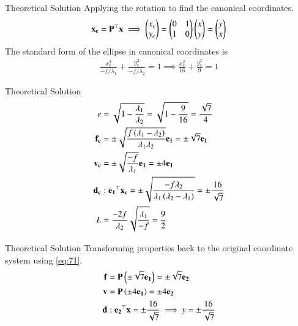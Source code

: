 \documentclass{beamer}
\begin{document}
	\begin{frame}{Theoretical Solution}
		Applying the rotation to find the canonical coordinates.
		\begin{align}
			\mathbf{x_c} = \mathbf{P}^\top\mathbf{x} \implies \begin{pmatrix}x_c \\ y_c\end{pmatrix} = \begin{pmatrix}0 & 1 \\ 1 & 0\end{pmatrix}\begin{pmatrix}x \\ y\end{pmatrix} = \begin{pmatrix}y \\ x\end{pmatrix}
		\end{align}
		The standard form of the ellipse in canonical coordinates is
		\begin{align}
			\frac{x_c^2}{-f/\lambda_1} + \frac{y_c^2}{-f/\lambda_2} = 1 \implies \frac{x_c^2}{16} + \frac{y_c^2}{9} = 1
		\end{align}
	\end{frame}
	
	\begin{frame}{Theoretical Solution}
		\begin{align}
			e &= \sqrt{1 - \frac{\lambda_1}{\lambda_2}} = \sqrt{1 - \frac{9}{16}} = \frac{\sqrt{7}}{4} \\
			\mathbf{f_c} &= \pm\sqrt{\frac{f\left(\lambda_1 - \lambda_2\right)}{\lambda_1\lambda_2}}\mathbf{e_1} = \pm \sqrt{7}\mathbf{e_1} \\
			\mathbf{v_c} &= \pm\sqrt{\frac{-f}{\lambda_1}}\mathbf{e_1} = \pm 4\mathbf{e_1} \\
			\mathbf{d_c} &: \mathbf{e_1}^\top\mathbf{x_c} = \pm\sqrt{\frac{-f\lambda_2}{\lambda_1\left(\lambda_2-\lambda_1\right)}} = \pm\frac{16}{\sqrt{7}} \\
			L &= \frac{-2f}{\lambda_2}\sqrt{\frac{\lambda_1}{-f}} = \frac{9}{2}
		\end{align}
	\end{frame}
	
	\begin{frame}{Theoretical Solution}
		Transforming properties back to the original coordinate system using \eqref{eq:71}.
		\begin{align}
			\mathbf{f} &= \mathbf{P}\left(\pm \sqrt{7}\mathbf{e_1}\right) = \pm \sqrt{7}\mathbf{e_2} \\
			\mathbf{v} &= \mathbf{P}\left(\pm 4\mathbf{e_1}\right) = \pm 4\mathbf{e_2} \\
			\mathbf{d} &: \mathbf{e_2}^\top\mathbf{x} = \pm \frac{16}{\sqrt{7}} \implies y = \pm \frac{16}{\sqrt{7}}
		\end{align}
	\end{frame}
	
\end{document}
